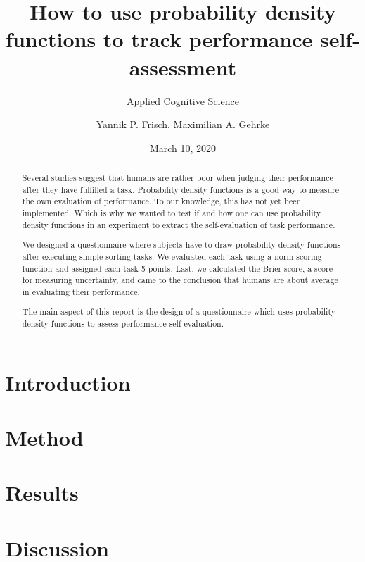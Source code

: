 \documentclass[
pdfa=false,  %
color=9c,
logo=body,
class=article,
logofile=../logos/tuda_logo.pdf
]{tudapub}
\author{Yannik P. Frisch, Maximilian A. Gehrke}
\title{How to use probability density functions to track performance self-assessment}
\date{March 10, 2020}
\subtitle{Applied Cognitive Science}
\begin{document}
\maketitle

\begin{abstract}
	Several studies suggest that humans are rather poor when judging their performance after they have fulfilled a task. Probability density functions is a good way to measure the own evaluation of performance. To our knowledge, this has not yet been implemented. Which is why we wanted to test if and how one can use probability density functions in an experiment to extract the self-evaluation of task performance.
	
	We designed a questionnaire where subjects have to draw probability density functions after executing simple sorting tasks. We evaluated each task using a norm scoring function and assigned each task 5 points. Last, we calculated the Brier score, a score for measuring uncertainty, and came to the conclusion that humans are about average in evaluating their performance.
	
	The main aspect of this report is the design of a questionnaire which uses probability density functions to assess performance self-evaluation. 
\end{abstract}

\newpage
\section{Introduction}
	\label{sec:introduction}
	
	
\newpage
\section{Method}
	\label{sec:method}
	
	
\newpage
\section{Results}
	\label{sec:results}
	
	
\newpage
\section{Discussion}
	\label{sec:discussion}
	
\end{document}
